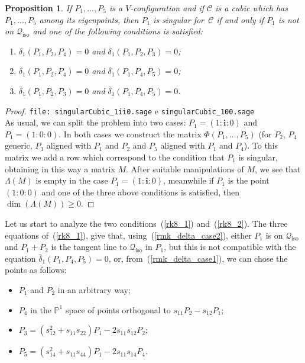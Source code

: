 \documentclass{amsart}
\theoremstyle{plain}
\newtheorem{prop}[lemma]{Proposition}
\theoremstyle{definition}
\newcommand{\iso}{\mathcal{Q}_{\mathrm{iso}}}
\newcommand{\iii}{\textbf{i}}
\begin{document}
\begin{prop}
\label{proposition:P1_sing}
If $P_1, \dots, P_5$ is a $V$-configuration and if
$\mathcal{C}$ is a cubic which
has $P_1, \dots, P_5$ among its eigenpoints, then $P_1$ is
singular for~$\mathcal{C}$ if
and only if $P_1$ is not on $\iso$ and one of the following conditions
is satisfied:
\begin{enumerate}
\item $\delta_1(P_1, P_2, P_4) = 0$ and $\overline{\delta}_1(P_1, P_2, P_3) = 0$;
\item $\delta_1(P_1, P_2, P_4) = 0$ and $\overline{\delta}_1(P_1, P_4, P_5) = 0$;
\item $\overline{\delta}_1(P_1, P_2, P_3) = 0$ and
$\overline{\delta}_1(P_1, P_4, P_5) = 0$.
\end{enumerate}
\end{prop}
\begin{proof}
\verb+file: singularCubic_1ii0.sage+ e \verb+singularCubic_100.sage+\\
As usual, we can split the problem into two cases: $P_1 = (1: \iii: 0)$
and $P_1 = (1: 0: 0)$. In both cases we construct the matrix
$\Phi(P_1, \dots, P_5)$ (for $P_2$, $P_4$ generic, $P_3$ aligned with
$P_1$ and $P_2$ and $P_5$ aligned with $P_1$ and $P_4$). To this matrix we add
a row which correspond to the condition that $P_1$ is singular, obtaining
in this way a matrix $M$. After
suitable manipulations of $M$, we see that $\Lambda(M)$ is empty
in the case $P_1=(1: \iii: 0)$, meanwhile if $P_1$ is the point $(1:0:0)$
and one of the three above conditions is satisfied, then
$\dim(\Lambda(M)) \geq 0$. 
\end{proof}

Let us start to analyze the two conditions~(\ref{rk8_1}) and~(\ref{rk8_2}).
The three equations of~(\ref{rk8_1}), give that,
using~(\ref{rmk_delta_case2}), either $P_1$ is on $\iso$ and
$P_1+P_2$ is the tangent line to $\iso$ in $P_1$, but this is not compatible
with the equation $\overline{\delta}_1(P_1, P_4, P_5)=0$, or,
from~(\ref{rmk_delta_case1}), we can chose the points as follows:
\begin{itemize}
\item $P_1$ and $P_2$ in an arbitrary way;
\item $P_4$ in the $\mathbb{P}^1$
space of points orthogonal to $s_{11}P_2-s_{12}P_1$;
\item $P_3 = (s_{12}^2+s_{11}s_{22})P_1-2s_{11}s_{12}P_2$;
\item $P_5 = (s_{14}^2+s_{11}s_{44})P_1-2s_{11}s_{14}P_4$.
\end{itemize}
\end{document}
